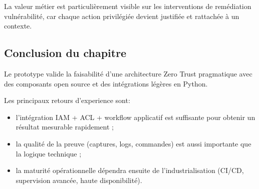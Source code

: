 La valeur métier est particulièrement visible sur les interventions de remédiation vulnérabilité, car chaque action privilégiée devient justifiée et rattachée à un contexte.



\subsection{Conclusion du chapitre}
Le prototype valide la faisabilité d'une architecture Zero Trust pragmatique avec des composants open source et des intégrations légères en Python.

Les principaux retours d'experience sont:
\begin{itemize}
	\item l'intégration IAM + ACL + workflow applicatif est suffisante pour obtenir un résultat mesurable rapidement ;
	\item la qualité de la preuve (captures, logs, commandes) est aussi importante que la logique technique ;
	\item la maturité opérationnelle dépendra ensuite de l'industrialisation (CI/CD, supervision avancée, haute disponibilité).
\end{itemize}